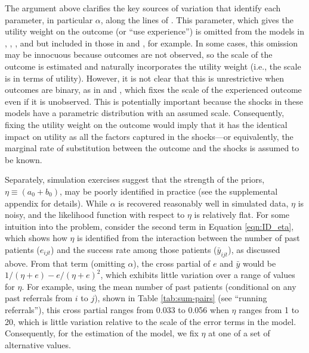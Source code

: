 \documentclass[12pt]{article}
\begin{document}
The argument above clarifies the key sources of variation that identify each parameter, in particular $\alpha$, along the lines of \cite{ching2013}.
This parameter, which gives the utility weight on the outcome (or ``use experience'') is omitted from the models in \cite{crawford2005}, \cite{ferreyra2011}, \cite{dickstein2018}, and \cite{gong2018} but included in those in \cite{ching2010} and \cite{ching2013}, for example. In some cases, this omission may be innocuous because outcomes are not observed, so the scale of the outcome is estimated and naturally incorporates the utility weight (i.e., the scale is in terms of utility).  However, it is not clear that this is unrestrictive when outcomes are binary, as in \cite{dickstein2018} and \cite{gong2018}, which fixes the scale of the experienced outcome even if it is unobserved. This is potentially important because the shocks in these models have a parametric distribution with an assumed scale. Consequently, fixing the utility weight on the outcome would imply that it has the identical impact on utility as all the factors captured in the shocks---or equivalently, the marginal rate of substitution between the outcome and the shocks is assumed to be known.

Separately, simulation exercises suggest that the strength of the priors, $\eta \equiv (a_0 + b_0)$, may be poorly identified in practice (see the supplemental appendix for details). While $\alpha$ is recovered reasonably well in simulated data, $\eta$ is noisy, and the likelihood function with respect to $\eta$ is relatively flat. For some intuition into the problem, consider the second term in Equation \eqref{eqn:ID_eta}, which shows how $\eta$ is identified from the interaction between the number of past patients ($e_{ijt}$) and the success rate among those patients ($\bar y_{ijt}$), as discussed above. From that term (omitting $\alpha$), the cross partial of $e$ and $\bar y$ would be $1/(\eta + e) - e/(\eta + e)^2$, which exhibits little variation over a range of values for $\eta$. For example, using the mean number of past patients (conditional on any past referrals from $i$ to $j$), shown in Table \ref{tab:sum-pairs}  (see ``running referrals''), this cross partial ranges from 0.033 to 0.056 when $\eta$ ranges from 1 to 20, which is little variation relative to the scale of the error terms in the model. Consequently, for the estimation of the model, we fix $\eta$ at one of a set of alternative values.
\end{document}
